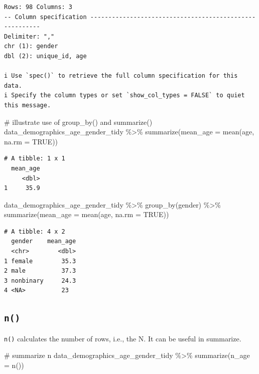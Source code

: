 \documentclass[
  letterpaper,
  DIV=11,
  numbers=noendperiod]{scrreprt}
\newenvironment{Shaded}{\begin{snugshade}}{\end{snugshade}}
\newcommand{\AttributeTok}[1]{\textcolor[rgb]{0.40,0.45,0.13}{#1}}
\newcommand{\CommentTok}[1]{\textcolor[rgb]{0.37,0.37,0.37}{#1}}
\newcommand{\ConstantTok}[1]{\textcolor[rgb]{0.56,0.35,0.01}{#1}}
\newcommand{\FunctionTok}[1]{\textcolor[rgb]{0.28,0.35,0.67}{#1}}
\newcommand{\NormalTok}[1]{\textcolor[rgb]{0.00,0.23,0.31}{#1}}
\newcommand{\SpecialCharTok}[1]{\textcolor[rgb]{0.37,0.37,0.37}{#1}}
\begin{document}
\begin{verbatim}
Rows: 98 Columns: 3
-- Column specification --------------------------------------------------------
Delimiter: ","
chr (1): gender
dbl (2): unique_id, age

i Use `spec()` to retrieve the full column specification for this data.
i Specify the column types or set `show_col_types = FALSE` to quiet this message.
\end{verbatim}

\begin{Shaded}
\begin{Highlighting}[]
\CommentTok{\# illustrate use of group\_by() and summarize()}
\NormalTok{data\_demographics\_age\_gender\_tidy }\SpecialCharTok{\%\textgreater{}\%}
  \FunctionTok{summarize}\NormalTok{(}\AttributeTok{mean\_age =} \FunctionTok{mean}\NormalTok{(age, }\AttributeTok{na.rm =} \ConstantTok{TRUE}\NormalTok{))}
\end{Highlighting}
\end{Shaded}

\begin{verbatim}
# A tibble: 1 x 1
  mean_age
     <dbl>
1     35.9
\end{verbatim}

\begin{Shaded}
\begin{Highlighting}[]
\NormalTok{data\_demographics\_age\_gender\_tidy }\SpecialCharTok{\%\textgreater{}\%}
  \FunctionTok{group\_by}\NormalTok{(gender) }\SpecialCharTok{\%\textgreater{}\%}
  \FunctionTok{summarize}\NormalTok{(}\AttributeTok{mean\_age =} \FunctionTok{mean}\NormalTok{(age, }\AttributeTok{na.rm =} \ConstantTok{TRUE}\NormalTok{))}
\end{Highlighting}
\end{Shaded}

\begin{verbatim}
# A tibble: 4 x 2
  gender    mean_age
  <chr>        <dbl>
1 female        35.3
2 male          37.3
3 nonbinary     24.3
4 <NA>          23  
\end{verbatim}

\subsection{\texorpdfstring{\texttt{n()}}{n()}}\label{n}

\texttt{n()} calculates the number of rows, i.e., the N. It can be
useful in summarize.

\begin{Shaded}
\begin{Highlighting}[]
\CommentTok{\# summarize n}
\NormalTok{data\_demographics\_age\_gender\_tidy }\SpecialCharTok{\%\textgreater{}\%}
  \FunctionTok{summarize}\NormalTok{(}\AttributeTok{n\_age =} \FunctionTok{n}\NormalTok{())}
\end{Highlighting}
\end{Shaded}
\end{document}
